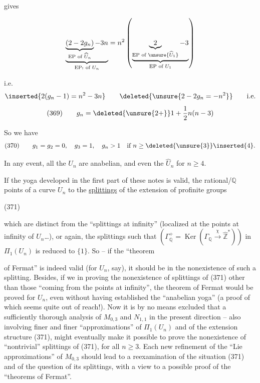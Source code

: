 
gives

\[
\underbrace{\underbrace{(2-2g_n)}_{\text{EP of }\widehat U_n}-3n}_{\text{EP}_{!}\text{ of }U_n}
=n^2\left(\underbrace{\underbrace{2}_{\text{EP of }\unsure{\widehat U_1}}-3}_{\text{EP of }U_1}\right)
\]

i.e.
\[
\inserted{2(g_n-1)=n^2-3n}
\qquad
\deleted{\unsure{2-2g_n=-n^2}}
\qquad \text{i.e.}
\]
\[
\text{(369)}\qquad g_n=\deleted{\unsure{2+}}1+\frac12 n(n-3)
\]

So we have
\[
\text{(370)}\qquad g_1=g_2=0,\quad g_3=1,\quad g_n>1\quad\text{if }n\geq\deleted{\unsure{3}}\inserted{4}.
\]

In any event, all the $U_n$ are anabelian, and even the $\widehat U_n$ for $n\geq4$.

If the  yoga developed in the first part of these notes is valid, the   rational/$\mathbb Q$ points of a curve $U_n$   to the \uline{splittings} of the extension of profinite groups

\begin{samepage}
\noindent (371)
\end{samepage}

which are distinct from the ``splittings at infinity'' (localized at the  points at infinity of $U_n$\ldots), or again, the splittings such that  $(\Gamma_{\mathbb Q}^{+}=\operatorname{Ker}(\Gamma_{\mathbb Q}\xrightarrow{\chi}\widehat{\mathbb Z}^{*}))$ in $\Pi_1(U_n)$ is reduced to $\{1\}$. So -- if the ``theorem


of Fermat'' is indeed valid (for $U_n$, say), it should be  in the nonexistence of such a splitting. Besides, if we  in proving the nonexistence of splittings of (371) other than those ``coming from the points at infinity'', the theorem of Fermat would be proved for $U_n$, even without having established the ``anabelian yoga'' (a proof of which seems quite out of reach!). Now it is by no means excluded that a sufficiently thorough analysis of $M_{0,3}$ and $N_{1,1}$ in the present direction -- also involving finer and finer ``approximations'' of $\Pi_1(U_n)$ and of the extension structure (371), might eventually make it possible to prove the nonexistence of ``nontrivial'' splittings of (371), for all $n\geq3$. Each new refinement of the ``Lie approximations'' of $M_{0,3}$ should lead to a reexamination of the situation (371) and of the question of its splittings, with a view to a possible proof of the ``theorems of Fermat''.

